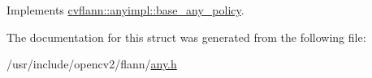 Implements \hyperlink{structcvflann_1_1anyimpl_1_1base__any__policy_a73e9e84ac08b0647fbcf1ee7ee2db117}{cvflann\-::anyimpl\-::base\-\_\-any\-\_\-policy}.



The documentation for this struct was generated from the following file\-:\begin{DoxyCompactItemize}
\item 
/usr/include/opencv2/flann/\hyperlink{any_8h}{any.\-h}\end{DoxyCompactItemize}
